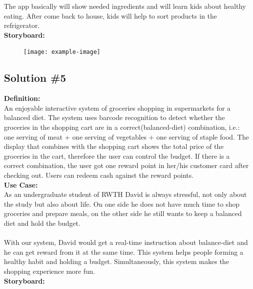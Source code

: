 \documentclass[a4paper,10pt,oneside]{scrreprt}
\begin{document}
			The app basically will show needed ingredients and will learn kids about healthy eating. After come back to house, kids will help to sort products in the refrigerator.\\

			\noindent \textbf{Storyboard:}\\

			\begin{figure}[H]
				\centering
				\texttt{[image: example-image]}
			\end{figure}

			\clearpage
			\subsection{Solution \#5}

				\noindent \textbf{Definition:}\\
				An enjoyable interactive system of groceries shopping in supermarkets for a balanced diet. The system uses barcode recognition to detect whether the groceries in the shopping cart are in a correct(balanced-diet) combination, i.e.: one serving of meat + one serving of vegetables + one serving of staple food. The display that combines with the shopping cart shows the total price of the groceries in the cart, therefore the user can control the budget. If there is a correct combination, the user got one reward point in her/his customer card after checking out. Users can redeem cash against the reward points.\\

				\noindent \textbf{Use Case:}\\
				As an undergraduate student of RWTH David is always stressful, not only about the study but also about life. On one side he does not have much time to shop groceries and prepare meals, on the other side he still wants to keep a balanced diet and hold the budget.\\
				\\
				With our system, David would get a real-time instruction about balance-diet and he can get reward from it at the same time. This system helps people forming a healthy habit and holding a budget. Simultaneously, this system makes the shopping experience more fun.\\

				\noindent \textbf{Storyboard:}\\
\end{document}
